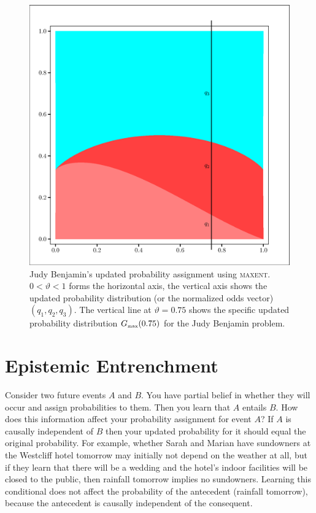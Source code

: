 \documentclass[smallextended]{svjour3}       %
\newcommand{\lwv}[0]{0.6}
\newcommand{\qvu}[0]{\vartheta}
\begin{document}
\begin{figure}[h!]
  \begin{flushright}
    \begin{minipage}[h]{\lwv\linewidth}
      \includegraphics[width=\textwidth]{zeroone-mxnt.eps}
      \caption{Judy Benjamin's updated probability assignment using
        \textsc{maxent}. $0<{\qvu}<1$ forms the horizontal axis, the
        vertical axis shows the updated probability distribution (or
        the normalized odds vector) $(q_{1},q_{2},q_{3})$. The
        vertical line at ${\qvu}=0.75$ shows the specific updated
        probability distribution $G_{\mbox{\tiny max}}(0.75)$ for the Judy
        Benjamin problem.}
      \label{fig:mxnt}
    \end{minipage}
  \end{flushright}
\end{figure}

\section{Epistemic Entrenchment}
\label{epent}

Consider two future events $A$ and $B$. You have partial belief in
whether they will occur and assign probabilities to them. Then you
learn that $A$ entails $B$. How does this information affect your
probability assignment for event $A$? If $A$ is causally independent
of $B$ then your updated probability for it should equal the original
probability. For example, whether Sarah and Marian have sundowners at
the Westcliff hotel tomorrow may initially not depend on the weather
at all, but if they learn that there will be a wedding and the hotel's
indoor facilities will be closed to the public, then rainfall tomorrow
implies no sundowners. Learning this conditional does not affect the
probability of the antecedent (rainfall tomorrow), because the
antecedent is causally independent of the consequent.
\end{document}
